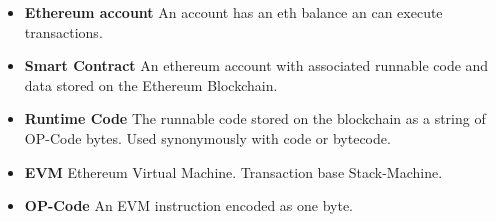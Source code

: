 \documentclass[../main.tex]{subfiles}
\begin{document}
\begin{itemize}
  \item \textbf{Ethereum account} An account has an eth balance an can execute transactions.
  \item \textbf{Smart Contract} An ethereum account with associated runnable code and data stored on the Ethereum Blockchain.
  \item \textbf{Runtime Code} The runnable code stored on the blockchain as a string of OP-Code bytes. Used synonymously with code or bytecode.
  \item \textbf{EVM} Ethereum Virtual Machine. Transaction base Stack-Machine.
  \item \textbf{OP-Code} An EVM instruction encoded as one byte.
\end{itemize}
\end{document}
